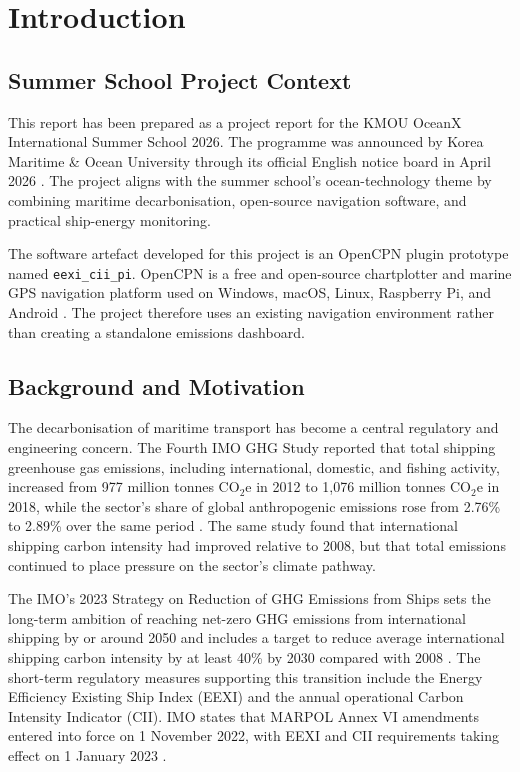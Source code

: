 \chapter{Introduction}
\label{chap:introduction}

\section{Summer School Project Context}
This report has been prepared as a project report for the KMOU OceanX International Summer School 2026. The programme was announced by Korea Maritime \& Ocean University through its official English notice board in April 2026 \cite{kmouOceanX2026}. The project aligns with the summer school's ocean-technology theme by combining maritime decarbonisation, open-source navigation software, and practical ship-energy monitoring.

The software artefact developed for this project is an OpenCPN plugin prototype named \texttt{eexi\_cii\_pi}. OpenCPN is a free and open-source chartplotter and marine GPS navigation platform used on Windows, macOS, Linux, Raspberry Pi, and Android \cite{opencpnOfficial2026}. The project therefore uses an existing navigation environment rather than creating a standalone emissions dashboard.

\section{Background and Motivation}
The decarbonisation of maritime transport has become a central regulatory and engineering concern. The Fourth IMO GHG Study reported that total shipping greenhouse gas emissions, including international, domestic, and fishing activity, increased from 977 million tonnes CO$_2$e in 2012 to 1,076 million tonnes CO$_2$e in 2018, while the sector's share of global anthropogenic emissions rose from 2.76\% to 2.89\% over the same period \cite{imoFourthGhg2020}. The same study found that international shipping carbon intensity had improved relative to 2008, but that total emissions continued to place pressure on the sector's climate pathway.

The IMO's 2023 Strategy on Reduction of GHG Emissions from Ships sets the long-term ambition of reaching net-zero GHG emissions from international shipping by or around 2050 and includes a target to reduce average international shipping carbon intensity by at least 40\% by 2030 compared with 2008 \cite{imoGhgStrategy2026}. The short-term regulatory measures supporting this transition include the Energy Efficiency Existing Ship Index (EEXI) and the annual operational Carbon Intensity Indicator (CII). IMO states that MARPOL Annex VI amendments entered into force on 1 November 2022, with EEXI and CII requirements taking effect on 1 January 2023 \cite{imoEexiCiiFaq2026}.

